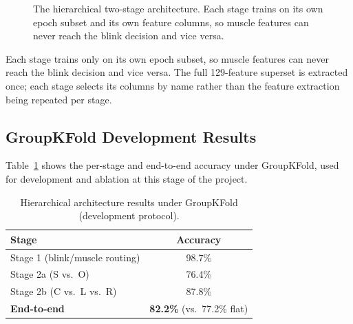 \begin{figure}[htbp]
\centering
{}
\caption{The hierarchical two-stage architecture. Each stage trains
on its own epoch subset and its own feature columns, so muscle
features can never reach the blink decision and vice versa.}
\label{fig:hierarchical_arch}
\end{figure}

Each stage trains only on its own epoch subset, so muscle features
can never reach the blink decision and vice versa. The full
129-feature superset is extracted once; each stage selects its
columns by name rather than the feature extraction being repeated
per stage.

\subsection{GroupKFold Development Results}

Table~\ref{tab:hierarchical_results} shows the per-stage and
end-to-end accuracy under GroupKFold, used for development and
ablation at this stage of the project.

\begin{table}[htbp]
\centering
\caption{Hierarchical architecture results under GroupKFold
(development protocol).}
\label{tab:hierarchical_results}
\renewcommand{\arraystretch}{1.3}
\begin{tabular}{l c}
\toprule
\textbf{Stage} & \textbf{Accuracy} \\
\midrule
Stage 1 (blink/muscle routing) & 98.7\% \\
Stage 2a (S vs.\ O)            & 76.4\% \\
Stage 2b (C vs.\ L vs.\ R)     & 87.8\% \\
\midrule
\textbf{End-to-end} & \textbf{82.2\%} (vs.\ 77.2\% flat) \\
\bottomrule
\end{tabular}
\end{table}

